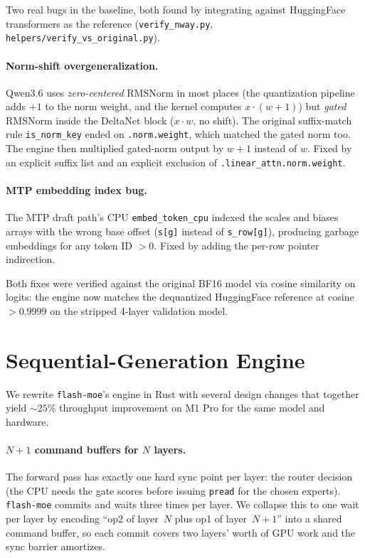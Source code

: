 \documentclass[11pt,a4paper]{article}
\begin{document}
Two real bugs in the baseline, both found by integrating against
HuggingFace transformers as the reference (\texttt{verify\_nway.py},
\texttt{helpers/verify\_vs\_original.py}).

\paragraph{Norm-shift overgeneralization.} Qwen3.6 uses
\emph{zero-centered} RMSNorm in most places (the quantization pipeline
adds $+1$ to the norm weight, and the kernel computes $x \cdot (w + 1)$)
but \emph{gated} RMSNorm inside the DeltaNet block ($x \cdot w$, no
shift). The original suffix-match rule
\texttt{is\_norm\_key} ended on \texttt{.norm.weight}, which matched
the gated norm too. The engine then multiplied gated-norm output by
$w{+}1$ instead of $w$. Fixed by an explicit suffix list and an
explicit exclusion of \texttt{.linear\_attn.norm.weight}.

\paragraph{MTP embedding index bug.} The MTP draft path's CPU
\texttt{embed\_token\_cpu} indexed the scales and biases arrays with
the wrong base offset (\texttt{s[g]} instead of \texttt{s\_row[g]}),
producing garbage embeddings for any token ID $> 0$. Fixed by adding
the per-row pointer indirection.

Both fixes were verified against the original BF16 model via cosine
similarity on logits: the engine now matches the dequantized
HuggingFace reference at cosine $> 0.9999$ on the stripped 4-layer
validation model.

\section{Sequential-Generation Engine}\label{sec:seq}

We rewrite \texttt{flash-moe}'s engine in Rust with several design
changes that together yield $\sim 25\%$ throughput improvement on M1
Pro for the same model and hardware.

\paragraph{$N{+}1$ command buffers for $N$ layers.} The forward pass
has exactly one hard sync point per layer: the router decision (the CPU
needs the gate scores before issuing \texttt{pread} for the chosen
experts). \texttt{flash-moe} commits and waits three times per layer.
We collapse this to one wait per layer by encoding ``op2 of layer~$N$
plus op1 of layer~$N{+}1$'' into a shared command buffer, so each
commit covers two layers' worth of GPU work and the sync barrier
amortizes.
\end{document}
